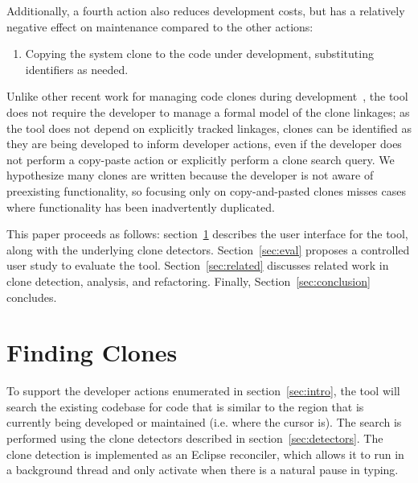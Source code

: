 \documentclass[preprint,10pt]{sigplanconf}
\begin{document}
Additionally, a fourth action also reduces development costs, but has
a relatively negative effect on maintenance compared to the other
actions:

\begin{enumerate}
  \item Copying the system clone to the code under development,
    substituting identifiers as needed.
\end{enumerate}

Unlike other recent work for managing code clones during
development~\cite{deWit2009, Duala-Ekoko2007}, the tool does not
require the developer to manage a formal model of the clone linkages;
as the tool does not depend on explicitly tracked linkages, clones can
be identified as they are being developed to inform developer actions,
even if the developer does not perform a copy-paste action or
explicitly perform a clone search query.  We hypothesize many clones 
are written because the developer is not aware of preexisting functionality,
 so focusing only on copy-and-pasted clones
misses cases where functionality has been inadvertently 
duplicated.

This paper proceeds as follows: section~\ref{sec:finding-clones}
describes the user interface for the tool, along with the underlying
clone detectors. Section~\ref{sec:eval} proposes a controlled user
study to evaluate the tool. Section~\ref{sec:related} discusses
related work in clone detection, analysis, and refactoring. Finally,
Section~\ref{sec:conclusion} concludes.

\section{Finding Clones}
\label{sec:finding-clones}



To support the developer actions enumerated in section~\ref{sec:intro},
the tool will search the existing codebase for code
that is similar to the region that is currently being developed or maintained
(i.e. where the cursor is). The search is performed using the clone detectors
described in section~\ref{sec:detectors}. The clone detection is implemented as
an Eclipse reconciler, which allows it to run in a background thread and only activate 
when there is a natural pause in typing.
\end{document}
